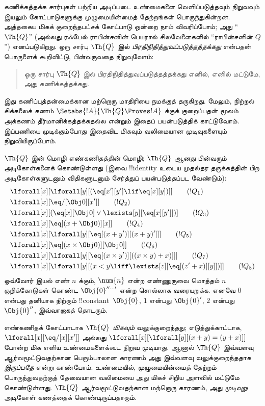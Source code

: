 \documentclass[../../../include/open-logic-section]{subfiles}
\begin{document}


கணிக்கத்தக்க சார்புகள் பற்றிய அடிப்படை உண்மைகளை வெளிப்படுத்தவும்
நிறுவவும் இயலும் கோட்பாடுகளுக்கு முழுமையின்மைத் தேற்றங்கள் பொருந்துகின்றன.
அத்தகைய மிகக் குறைந்தபட்சக் கோட்பாடு ஒன்றை நாம் விவரிப்போம்; அது
``$\Th{Q}$'' (அல்லது ரஃபேல் ராபின்சனின் பெயரால் சிலவேளைகளில்
``ராபின்சனின் $Q$'') எனப்படுகிறது. ஒரு சார்பு $\Th{Q}$ இல்
\emph{பிரதிநிதித்துவப்படுத்தத்தக்கது} என்பதன் பொருளைக் கூறிவிட்டு,
பின்வருவதை நிறுவுவோம்:
\begin{quote}
  ஒரு சார்பு $\Th{Q}$ இல் பிரதிநிதித்துவப்படுத்தத்தக்கது எனில், எனில்
  மட்டுமே, அது கணிக்கத்தக்கது.
\end{quote}
இது கணிப்புத்தன்மைக்கான மற்றொரு மாதிரியை நமக்குத் தருகிறது. மேலும்,
நிற்றல் சிக்கலைக் கணம் $\Setabs{!A}{\Th{Q} \Proves !A}$ க்குக்
குறைப்பதன் மூலம் அக்கணம் தீர்மானிக்கத்தக்கதல்ல என்றும் இதைப் பயன்படுத்திக்
காட்டுவோம். இப்பணியை முடிக்கும்போது இதைவிட மிகவும் வலிமையான முடிவுகளையும்
நிறுவியிருப்போம்.

$\Th{Q}$ இன் மொழி எண்கணிதத்தின் மொழி; $\Th{Q}$ ஆனது பின்வரும்
அடிகோள்களைக் கொண்டுள்ளது (இவை !!{identity} உடைய முதல்தர தருக்கத்தின்
பிற அடிகோள்களுடனும் விதிகளுடனும் சேர்த்துப் பயன்படுத்தப்பட வேண்டும்):
\begin{align*}
& \lforall[x][\lforall[y][(\eq[x'][y'] \lif \eq[x][y])]] \tag{$!Q_1$}\\
& \lforall[x][\eq/[\Obj 0][x']] \tag{$!Q_2$}\\
& \lforall[x][(\eq[x][\Obj 0] \lor \lexists[y][\eq[x][y']])] \tag{$!Q_3$}\\
& \lforall[x][\eq[(x + \Obj 0)][x]] \tag{$!Q_4$}\\
& \lforall[x][\lforall[y][\eq[(x + y')][(x + y)']]] \tag{$!Q_5$}\\
& \lforall[x][\eq[(x \times \Obj 0)][\Obj 0]] \tag{$!Q_6$}\\
& \lforall[x][\lforall[y][\eq[(x \times y')][((x \times y) + x)]]] \tag{$!Q_7$}\\
& \lforall[x][\lforall[y][(x < y \liff \lexists[z][\eq[(z' + x)][y]])]] \tag{$!Q_8$}
\end{align*}
ஒவ்வோர் இயல் எண் $n$ க்கும், $\num{n}$ என்ற எண்ணுருவை மொத்தம்
$n$ குறிக்கோடுகள் கொண்ட $\Obj{0}^{\prime\prime\ldots\prime}$ என்ற
சொல்லாக வரையறுக்க. எனவே $\num{0}$ என்பது தனியாக நிற்கும்
!!{constant}~$\Obj{0}$, $\num{1}$ என்பது $\Obj{0}'$, $\num{2}$
என்பது $\Obj{0}''$, இவ்வாறாகத் தொடரும்.

எண்கணிதக் கோட்பாடாக $\Th{Q}$ \emph{மிகவும்} வலுக்குறைந்தது;
எடுத்துக்காட்டாக, $\lforall[x][\eq/[x][x']]$ அல்லது
$\lforall[x][\lforall[y][(x + y) = (y + x)]]$ போன்ற மிக எளிய
உண்மைகளைக்கூட நிறுவ முடியாது. ஆனால் $\Th{Q}$ இவ்வளவு ஆர்வமூட்டுவதற்கான
பெரும்பாலான காரணம் அது இவ்வளவு வலுக்குறைந்ததாக \emph{இருப்பதே} என்று
காண்போம். உண்மையில், முழுமையின்மைத் தேற்றம் பொருந்துவதற்குத் தேவையான
வலிமையை அது மிகச் சிறிய அளவில் மட்டுமே கொண்டுள்ளது. $\Th{Q}$
ஆர்வமூட்டுவதற்கான மற்றொரு காரணம், அது \emph{முடிவுறு} அடிகோள் கணத்தைக்
கொண்டிருப்பதாகும்.
\end{document}
